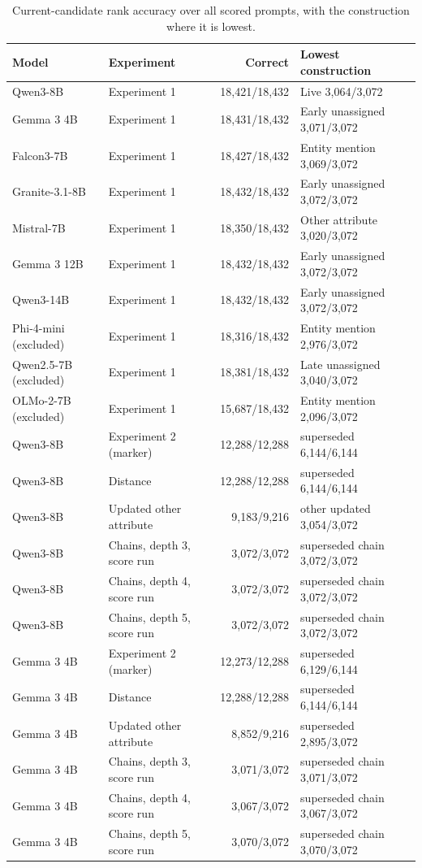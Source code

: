 \begin{table}[h]
\caption{Current-candidate rank accuracy over all scored prompts, with the construction where it is lowest.}
\label{tab:c-accuracy}
\begin{center}
\footnotesize
\begin{tabular}{@{}llrl@{}}
\toprule
Model & Experiment & Correct & Lowest construction \\
\midrule
Qwen3-8B & Experiment 1 & 18,421/18,432 & Live 3,064/3,072 \\
Gemma 3 4B & Experiment 1 & 18,431/18,432 & Early unassigned 3,071/3,072 \\
Falcon3-7B & Experiment 1 & 18,427/18,432 & Entity mention 3,069/3,072 \\
Granite-3.1-8B & Experiment 1 & 18,432/18,432 & Early unassigned 3,072/3,072 \\
Mistral-7B & Experiment 1 & 18,350/18,432 & Other attribute 3,020/3,072 \\
Gemma 3 12B & Experiment 1 & 18,432/18,432 & Early unassigned 3,072/3,072 \\
Qwen3-14B & Experiment 1 & 18,432/18,432 & Early unassigned 3,072/3,072 \\
Phi-4-mini (excluded) & Experiment 1 & 18,316/18,432 & Entity mention 2,976/3,072 \\
Qwen2.5-7B (excluded) & Experiment 1 & 18,381/18,432 & Late unassigned 3,040/3,072 \\
OLMo-2-7B (excluded) & Experiment 1 & 15,687/18,432 & Entity mention 2,096/3,072 \\
Qwen3-8B & Experiment 2 (marker) & 12,288/12,288 & superseded 6,144/6,144 \\
Qwen3-8B & Distance & 12,288/12,288 & superseded 6,144/6,144 \\
Qwen3-8B & Updated other attribute & 9,183/9,216 & other updated 3,054/3,072 \\
Qwen3-8B & Chains, depth 3, score run & 3,072/3,072 & superseded chain 3,072/3,072 \\
Qwen3-8B & Chains, depth 4, score run & 3,072/3,072 & superseded chain 3,072/3,072 \\
Qwen3-8B & Chains, depth 5, score run & 3,072/3,072 & superseded chain 3,072/3,072 \\
Gemma 3 4B & Experiment 2 (marker) & 12,273/12,288 & superseded 6,129/6,144 \\
Gemma 3 4B & Distance & 12,288/12,288 & superseded 6,144/6,144 \\
Gemma 3 4B & Updated other attribute & 8,852/9,216 & superseded 2,895/3,072 \\
Gemma 3 4B & Chains, depth 3, score run & 3,071/3,072 & superseded chain 3,071/3,072 \\
Gemma 3 4B & Chains, depth 4, score run & 3,067/3,072 & superseded chain 3,067/3,072 \\
Gemma 3 4B & Chains, depth 5, score run & 3,070/3,072 & superseded chain 3,070/3,072 \\
\bottomrule
\end{tabular}
\end{center}
\end{table}

\FloatBarrier
